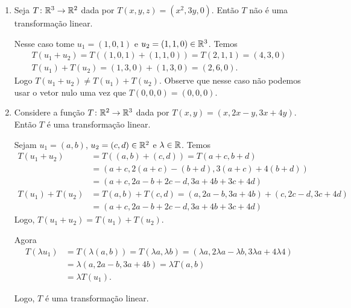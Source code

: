 \begin{exemplo}
\begin{enumerate}[label={\arabic*})]
        \item Seja $T \colon \mathbb{R}^3 \to \mathbb{R}^2$ dada por $T(x, y, z) = (x^2, 3y, 0)$. Então $T$ não é uma transformação linear.
        \begin{solucao}
            Nesse caso tome $u_1 = (1, 0, 1)$ e $u_2 = (1, 1, 0) \in \mathbb{R}^3$. Temos
            \begin{align*}
                T(u_1 + u_2) = T((1, 0, 1) + (1, 1, 0)) = T(2, 1, 1) = (4, 3, 0)\\
                T(u_1) + T(u_2) = (1, 3, 0) + (1, 3, 0) = (2, 6, 0).
            \end{align*}
            Logo $T(u_1 + u_2) \ne T(u_1) + T(u_2)$. Observe que nesse caso não podemos usar o vetor nulo uma vez que $T(0, 0, 0) = (0, 0, 0)$.
        \end{solucao}

        \item Considere a função $T \colon \mathbb{R}^2 \to \mathbb{R}^3$ dada por $T(x, y) = (x, 2x - y, 3x + 4y)$. Então $T$ é uma transformação linear.
        \begin{solucao}
            Sejam $u_1 = (a, b)$, $u_2 = (c, d) \in \mathbb{R}^2$ e $\lambda \in \mathbb{R}$. Temos
            \begin{align*}
                T(u_1 + u_ 2) &= T((a, b) + (c, d)) = T(a + c, b + d) \\ &= (a + c, 2(a + c) - (b + d), 3(a + c) + 4(b + d)) \\ &= (a + c, 2a - b + 2c - d, 3a + 4b + 3c + 4d)\\
                T(u_1) + T(u_2) &= T(a, b) + T(c, d) = (a, 2a - b, 3a + 4b) + (c, 2c - d, 3c + 4d) \\ &= (a + c, 2a - b + 2c - d, 3a + 4b + 3c + 4d)
            \end{align*}
            Logo, $T(u_1 + u_2) = T(u_1) + T(u_2)$.

            Agora
            \begin{align*}
                T(\lambda u_1) &= T(\lambda (a, b)) = T(\lambda a, \lambda b) = (\lambda a, 2\lambda a - \lambda b, 3\lambda a + 4\lambda 4) \\ &= \lambda (a, 2a - b, 3a + 4b) = \lambda T(a, b) \\ &= \lambda T(u_1).
            \end{align*}

            Logo, $T$ é uma transformação linear.
        \end{solucao}


\end{enumerate}
\end{exemplo}

